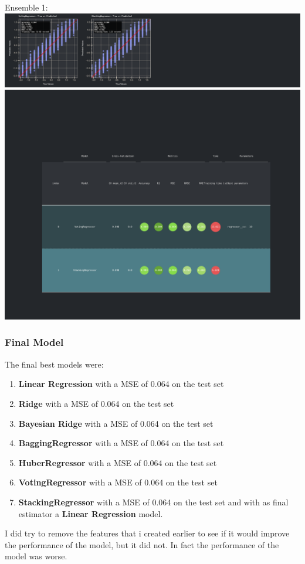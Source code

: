 \documentclass{assignment}
\begin{document}
\begin{center}
    Ensemble 1:
    \includegraphics[width=6.5in]{../report/assets/ensemble_1_best_models_result.pdf}    
    \includegraphics[width=6.5in]{../report/assets/ensemble_1_best_models_result_table.pdf}
\end{center}

\subsubsection{Final Model}
The final best models were:
\begin{enumerate}
    \item \textbf{Linear Regression} with a MSE of 0.064 on the test set
    \item \textbf{Ridge} with a MSE of 0.064 on the test set
    \item \textbf{Bayesian Ridge} with a MSE of 0.064 on the test set
    \item \textbf{BaggingRegressor} with a MSE of 0.064 on the test set
    \item \textbf{HuberRegressor} with a MSE of 0.064 on the test set
    \item \textbf{VotingRegressor} with a MSE of 0.064 on the test set
    \item \textbf{StackingRegressor} with a MSE of 0.064 on the test set and with as final estimator a \textbf{Linear Regression} model.
\end{enumerate}
I did try to remove the features that i created earlier to see if it would improve the performance of the model, but it did not.  
In fact the performance of the model was worse.
\end{document}
